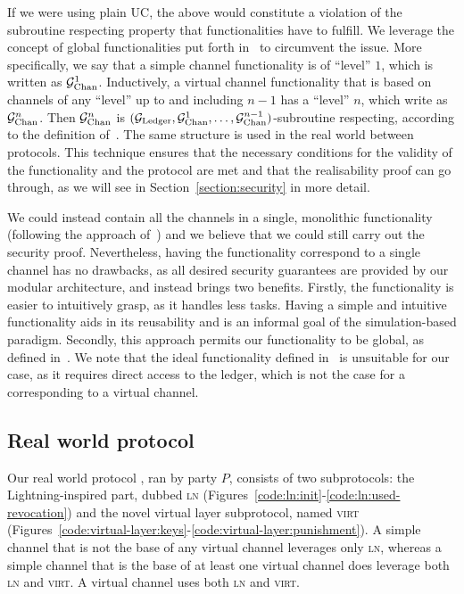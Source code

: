   If we were using plain UC, the above would constitute a violation of the
  subroutine respecting property that functionalities have to fulfill. We
  leverage the concept of global functionalities put forth
  in~\cite{DBLP:conf/tcc/BadertscherCHTZ20} to circumvent the issue. More
  specifically, we say that a simple channel functionality is of ``level'' $1$,
  which is written as $\mathcal{G}_{\mathrm{Chan}}^{1}$. Inductively, a virtual channel
  functionality that is based on channels of any ``level'' up to and including
  $n-1$ has a ``level'' $n$, which write as $\mathcal{G}_{\mathrm{Chan}}^{n}$. Then $\mathcal{G}_{\mathrm{Chan}}^{n}$
  is $(\mathcal{G}_{\mathrm{Ledger}}, \mathcal{G}_{\mathrm{Chan}}^{1}, \dots, \mathcal{G}_{\mathrm{Chan}}^{n-1})$-subroutine respecting,
  according to the definition of~\cite{DBLP:conf/tcc/BadertscherCHTZ20}. The
  same structure is used in the real world between protocols. This
  technique ensures that the necessary conditions for the validity of the
  functionality and the protocol are met and that the realisability proof can go
  through, as we will see in Section~\ref{section:security} in more detail.

  We could instead contain all the channels in a single, monolithic
  functionality (following the approach of~\cite{DBLP:conf/csfw/KiayiasL20}) and
  we believe that we could still carry out the security proof. Nevertheless,
  having the functionality correspond to a single channel has no drawbacks, as
  all desired security guarantees are provided by our modular architecture, and
  instead brings two benefits. Firstly, the functionality is easier to
  intuitively grasp, as it handles less tasks. Having a simple and intuitive
  functionality aids in its reusability and is an informal goal of the
  simulation-based paradigm. Secondly, this approach permits our functionality
  to be global, as defined in~\cite{DBLP:conf/tcc/BadertscherCHTZ20}.
  We note that the ideal functionality defined in~\cite{cryptoeprint:2020:476}
  is unsuitable for our case, as it requires direct access to the ledger, which
  is not the case for a \fchan corresponding to a virtual channel.

  \subsection{Real world protocol \pchan}
  \label{construction:real-world}
  Our real world protocol \pchan, ran by party $P$, consists of two
  subprotocols: the Lightning-inspired part, dubbed \textsc{ln}
  (Figures~\ref{code:ln:init}-\ref{code:ln:used-revocation}) and the novel
  virtual layer subprotocol, named \textsc{virt}
  (Figures~\ref{code:virtual-layer:keys}-\ref{code:virtual-layer:punishment}). A
  simple channel that is not the base of any virtual channel leverages only
  \textsc{ln}, whereas a simple channel that is the base of at least one virtual
  channel does leverage both \textsc{ln} and \textsc{virt}. A virtual channel
  uses both \textsc{ln} and \textsc{virt}.

